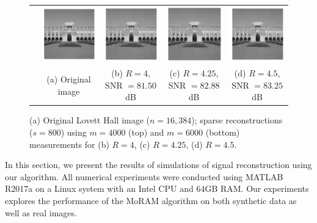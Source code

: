 \begin{figure}[t!]
\begin{center}
\begin{tabular}{ccccc}
			\rotatebox{90}{$~~~~~~~m=6000$} &
			\includegraphics[width=0.22\linewidth]{./fig/lovett_original.pdf} &
			\includegraphics[width=0.22\linewidth]{./fig/lovett_r4_m_6000_s_800.pdf} & 
			\includegraphics[width=0.22\linewidth]{./fig/lovett_r425_m_6000_s_800.pdf} &
			\includegraphics[width=0.22\linewidth]{./fig/lovett_r450_m_6000_s_800.pdf}  \\
			& \small{(a) Original image}& \small{(b) $R=4$, SNR $=81.50$dB}& \small{(c) $R=4.25$, SNR $=82.88$dB}& \small{(d) $R=4.5$, SNR $=83.25$dB} \\
		\end{tabular}
	\end{center}
	\caption{{(a) Original Lovett Hall image ($n=16,384$); sparse reconstructions ($s=800$) using $m=4000$ (top) and $m=6000$ (bottom) measurements for (b) $R=4$, (c) $R=4.25$, (d) $R=4.5$.}}
	\label{fig:lovett}
\end{figure}

In this section, we present the results of simulations of signal reconstruction using our algorithm. All numerical experiments were conducted using MATLAB R2017a on a Linux system with an Intel CPU and 64GB RAM. Our experiments explores the performance of the MoRAM algorithm on both synthetic data as well as real images.


